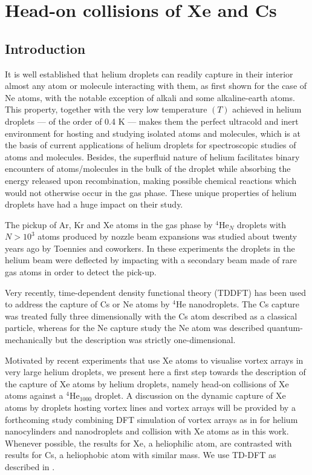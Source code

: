 \chapter{Head-on collisions of Xe and Cs}\label{ch:head-on-xece}
	\section{Introduction}\label{sec:intro-collisions}
		It is well established that helium droplets can readily capture in their interior almost any atom or molecule interacting with them, as first shown for the case of Ne atoms\citep{Sch90}, with the notable exception of alkali\citep{Sti96} and some alkaline-earth\citep{Her07} atoms. This property, together with the very low temperature $(T)$ achieved in helium droplets --- of the order of 0.4 K --- makes them the perfect ultracold and inert environment for hosting and studying isolated atoms and molecules, which is at the basis of current applications of helium droplets for spectroscopic studies of atoms and molecules. Besides, the superfluid nature of helium facilitates binary encounters of atoms/molecules in the bulk of the droplet while absorbing the energy released upon recombination, making possible chemical reactions which would not otherwise occur in the gas phase. These unique properties  of helium droplets have had a huge impact on their study\citep{Toe04,Sti06,Tig07,Cal11a,Mud14}.

		The pickup of Ar, Kr and Xe atoms in the gas phase by $^4$He$_N$ droplets with $N> 10^3$ atoms produced by nozzle beam expansions was studied about twenty years ago by Toennies and coworkers\citep{Lew95}. In these experiments the droplets in the helium beam were deflected by impacting with a secondary beam made of rare gas atoms in order to detect the pick-up. 

		Very recently, time-dependent density functional theory (TDDFT) has been used to address the capture of Cs or Ne atoms by $^4$He nanodroplets\citep{Lea14a,Vil16b}. The Cs capture was treated fully three dimensionally with the Cs atom described as a classical particle, whereas for the Ne capture study the Ne atom was described quantum-mechanically but the description was strictly one-dimensional.
			
		Motivated by recent experiments that use Xe atoms to visualise vortex arrays in very large helium droplets\citep{Gom14,Jon16}, we present here a first step towards the description of the capture  of Xe atoms by helium droplets, namely head-on collisions of Xe atoms against a $^4$He$_{1000}$ droplet. A discussion on the dynamic capture of Xe atoms by droplets hosting vortex lines and vortex arrays will be provided by a forthcoming study combining DFT simulation of vortex arrays as in for helium nanocylinders and nanodroplets  and collision with Xe atoms as in this work. Whenever possible, the results for Xe, a heliophilic atom,  are contrasted with results for Cs, a heliophobic atom with similar mass. We use TD-DFT as described in . 

